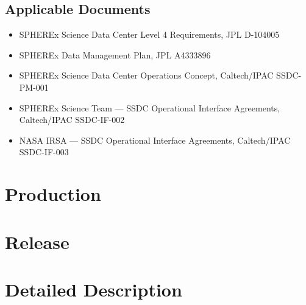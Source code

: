 \documentclass[DP]{spherex}
\begin{document}
\subsection{Applicable Documents}


\begin{itemize}
  \item SPHEREx Science Data Center Level 4 Requirements, JPL D-104005
  \item SPHEREx Data Management Plan, JPL A4333896
  \item SPHEREx Science Data Center Operations Concept, Caltech/IPAC SSDC-PM-001
  \item SPHEREx Science Team --- SSDC Operational Interface Agreements, Caltech/IPAC SSDC-IF-002
  \item NASA IRSA --- SSDC Operational Interface Agreements, Caltech/IPAC SSDC-IF-003
\end{itemize}


\section{Production}



\section{Release}



\section{Detailed Description}


% 
\end{document}
